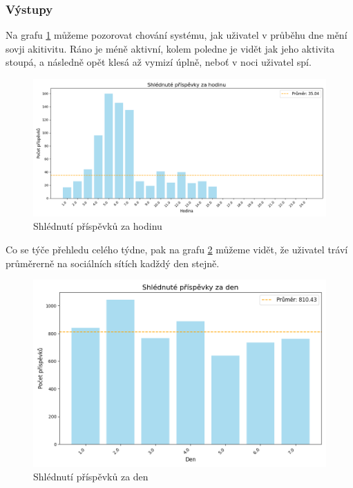 \documentclass[11pt, a4paper]{article}
\begin{document}
\subsubsection{Výstupy}
Na grafu \ref{fig:Shlédnuté_příspěvky_za_hodinu} můžeme pozorovat chování systému, jak uživatel v průběhu dne mění sovji akitivitu.
Ráno je méně aktivní, kolem poledne je vidět jak jeho aktivita stoupá, a následně opět klesá až vymizí úplně, neboť v noci uživatel spí.
\begin{figure}[h]
    \centering
    \includegraphics[width=\linewidth]{Shlédnuté_příspěvky_za_hodinu.png}
    \caption{Shlédnutí příspěvků za hodinu}
    \label{fig:Shlédnuté_příspěvky_za_hodinu}
\end{figure}

\newpage

Co se týče přehledu celého týdne, pak na grafu \ref{fig:Shlédnuté_příspěvky_za_den} můžeme vidět, že uživatel tráví průměrerně na sociálních sítích kadždý den stejně.
\begin{figure}[h]
    \centering
    \includegraphics[width=0.5\linewidth]{Shlédnuté_příspěvky_za_den.png}
    \caption{Shlédnutí příspěvků za den}
    \label{fig:Shlédnuté_příspěvky_za_den}
\end{figure}
\end{document}
